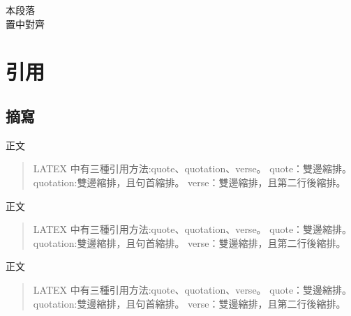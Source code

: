 \begin{center}
    本段落\\
    置中對齊
\end{center}

\section{引用}
\subsection{摘寫}\label{ssec_qute}
正文
\begin{quote}
    LATEX 中有三種引用方法:quote、quotation、verse。
    quote：雙邊縮排。
    quotation:雙邊縮排，且句首縮排。
    verse：雙邊縮排，且第二行後縮排。
\end{quote}
正文
\begin{quotation}
    LATEX 中有三種引用方法:quote、quotation、verse。
    quote：雙邊縮排。
    quotation:雙邊縮排，且句首縮排。
    verse：雙邊縮排，且第二行後縮排。
\end{quotation}
正文
\begin{verse}
    LATEX 中有三種引用方法:quote、quotation、verse。
    quote：雙邊縮排。
    quotation:雙邊縮排，且句首縮排。
    verse：雙邊縮排，且第二行後縮排。
\end{verse}



\newpage





